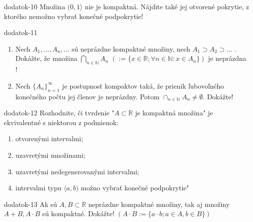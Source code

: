 \begin{defproblem}{dodatok-10}
Množina $(0,1 \rangle$ nie je kompaktná. Nájdite také jej otvorené pokrytie, z ktorého nemožno vybrať konečné podpokrytie!
\end{defproblem}

\begin{defproblem}{dodatok-11}
\begin{enumerate}
\item Nech $A_1,...,A_n,...$ sú neprázdne kompaktné množiny, nech $A_1 \supset A_2 \supset ...$ . Dokážte, že množina $\bigcap_{n \in \mathbb{N}}A_n$  $(:=\{x \in \mathbb{R}; \forall n \in \mathbb{N}: x \in A_n\})$ je neprázdna !
\item Nech ${\{A_n\}}_{n=1}^\infty$ je postupnosť kompaktov taká, že prienik ľubovoľného konečného počtu jej členov je neprázdny. Potom $\cap_{n \in \mathbb{N}} A_n \neq \emptyset$. Dokážte!
\end{enumerate}
\end{defproblem}

\begin{defproblem}{dodatok-12}
Rozhodnite, či tvrdenie "$A \subset \mathbb{R}$ je kompaktná množina" je ekvivalentné s niektorou z podmienok:
\begin{enumerate}
\item otvorenými intervalmi;
\item uzavretými množinami;
\item uzavretými nedegenerovanými intervalmi;
\item intervalmi typu $\langle a,b)$
možno vybrať konečné podpokrytie"
\end{enumerate}
\end{defproblem}

\begin{defproblem}{dodatok-13}
Ak sú $A,B \subset \mathbb{R}$ neprázdne kompaktné množiny, tak aj množiny $A+B,A \cdot B$ sú kompaktné. Dokážte! $(A \cdot B :=\{a \cdot b; a \in A, b \in B\})$
\end{defproblem}
